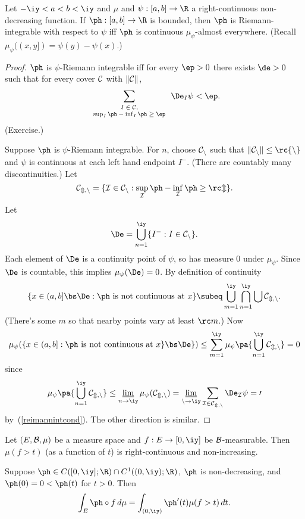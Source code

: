 \begin{thm}
Let $-\iy<a<b<\iy$ and $\mu$ and $\psi:[a,b]\to \R$ a right-continuous non-decreasing function. If $\ph:[a,b]\to \R$ is bounded, then $\ph$ is Riemann-integrable with respect to $\psi$ iff $\ph$ is continuous $\mu_{\psi}$-almost everywhere.
(Recall $\mu_{\psi}((x,y])=\psi(y)-\psi(x)$.)
\end{thm}
\begin{proof}
$\ph$ is $\psi$-Riemann integrable iff for every $\ep>0$ there exists $\de>0$ such that for every cover $\cal C$ with $\Vert \cal C\Vert$,
\begin{equation}\label{reimannintcond}
\sum_{\scriptsize\begin{array}{c}I\in \cal C,\\
\sup_I \ph-\inf_I \ph\ge \ep\end{array}}\De_I\psi<\ep.
\end{equation}
(Exercise.)

Suppose $\ph$ is $\psi$-Riemann integrable. For $n$, choose $\cal C_n$ such that $\Vert \cal C_n\Vert\le \rc{n}$ and $\psi$ is continuous at each left hand endpoint $I^-$. (There are countably many discontinuities.) Let 
\[
\cal C_{m,n}=\{I\in \cal C_n:\sup_I \ph-\inf_I\ph\ge \rc m\}.
\]
Let
\[
\De=\bigcup_{n=1}^{\iy} \{I^-:I\in \cal C_n\}.
\]
Each element of $\De$ is a continuity point of $\psi$, so has measure 0 under $\mu_{\psi}$. Since $\De$ is countable, this implies $\mu_{\psi} (\De)=0$. By definition of continuity
\[
\{x\in(a,b]\bs \De:\ph\text{ is not continuous at }x\}\subeq
\bigcup_{m=1}^{\iy} \bigcap_{n=1}^{\iy}\bigcup \cal C_{m,n}.
\]
(There's some $m$ so that nearby points vary at least $\rc m$.)
Now
\[
\mu_{\psi}(\{x\in(a,b]:\ph\text{ is not continuous at }x\}\bs \De\})\le \sum_{m=1}^{\iy} \mu_{\psi}\pa{\bigcup_{n=1}^{\iy} \cal C_{m,n}}=0
\]
since
\[
\mu_{\psi}\pa{\bigcup_{n=1}^{\iy} \cal C_{m,n}}\le \varliminf_{n\to \iy} \mu_{\psi}(\cal C_{m,n})
=\varliminf_{n\to \iy} \sum_{I\in \cal C_{m,n}} \De_I\psi= 0
\]
by~(\ref{reimannintcond}). The other direction is similar.
\end{proof}
\begin{thm}
Let $(E,\cal B, \mu)$ be a measure space and $f:E\to [0,\iy]$ be $\cal B$-measurable. Then $\mu(f>t)$ (as a function of $t$) is right-continuous and non-increasing.

Suppose $\ph\in C([0,\iy];\R)\cap C^1((0,\iy);\R)$, $\ph$ is non-decreasing, and $\ph(0)=0<\ph(t)$ for $t>0$. Then
\[
\int_E \ph\circ f\,d\mu=\int_{(0,\iy)} \ph'(t) \mu(f>t)\,dt.
\]
\end{thm}
